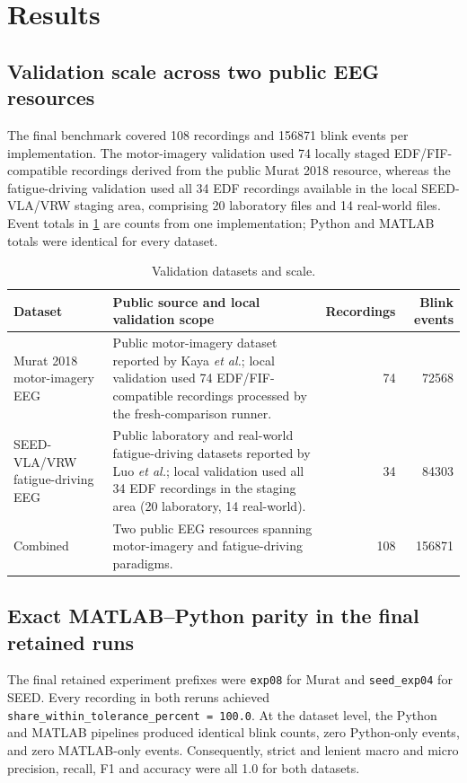 \section{Results}

\subsection{Validation scale across two public EEG resources}

The final benchmark covered 108 recordings and \num{156871} blink events per implementation. The motor-imagery validation used 74 locally staged EDF/FIF-compatible recordings derived from the public Murat 2018 resource, whereas the fatigue-driving validation used all 34 EDF recordings available in the local SEED-VLA/VRW staging area, comprising 20 laboratory files and 14 real-world files. Event totals in \cref{tab:datasets} are counts from one implementation; Python and MATLAB totals were identical for every dataset.

\begin{table}[t]
\centering
\caption{Validation datasets and scale.}
\label{tab:datasets}
\begin{tabularx}{\linewidth}{@{}lXrr@{}}
\toprule
Dataset & Public source and local validation scope & Recordings & Blink events \\
\midrule
Murat 2018 motor-imagery EEG & Public motor-imagery dataset reported by Kaya \emph{et al.}; local validation used 74 EDF/FIF-compatible recordings processed by the fresh-comparison runner. & 74 & \num{72568} \\
SEED-VLA/VRW fatigue-driving EEG & Public laboratory and real-world fatigue-driving datasets reported by Luo \emph{et al.}; local validation used all 34 EDF recordings in the staging area (20 laboratory, 14 real-world). & 34 & \num{84303} \\
Combined & Two public EEG resources spanning motor-imagery and fatigue-driving paradigms. & 108 & \num{156871} \\
\bottomrule
\end{tabularx}
\end{table}

\subsection{Exact MATLAB--Python parity in the final retained runs}

The final retained experiment prefixes were \texttt{exp08} for Murat and \texttt{seed\_exp04} for SEED. Every recording in both reruns achieved \texttt{share\_within\_tolerance\_percent = 100.0}. At the dataset level, the Python and MATLAB pipelines produced identical blink counts, zero Python-only events, and zero MATLAB-only events. Consequently, strict and lenient macro and micro precision, recall, F1 and accuracy were all 1.0 for both datasets.

